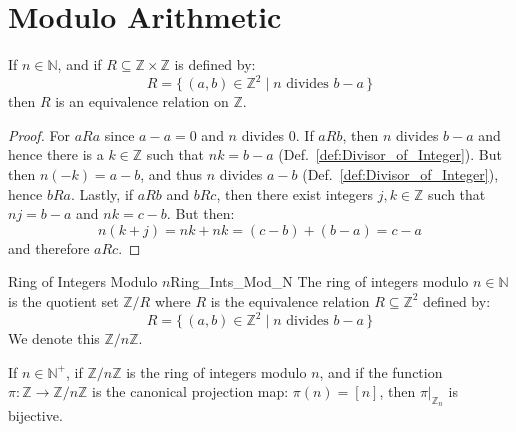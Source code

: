 \section{Modulo Arithmetic}
    \begin{theorem}
        \label{thm:Modulo_n_is_Equiv_Relation}%
        If $n\in\mathbb{N}$, and if
        $R\subseteq\mathbb{Z}\times\mathbb{Z}$ is defined by:
        \begin{equation}
            R=\{\,(a,b)\in\mathbb{Z}^{2}\;|\;
                n\textrm{ divides }b-a\,\}
        \end{equation}
        then $R$ is an equivalence relation on $\mathbb{Z}$.
    \end{theorem}
    \begin{proof}
        For $aRa$ since $a-a=0$ and $n$ divides 0. If $aRb$, then $n$
        divides $b-a$ and hence there is a $k\in\mathbb{Z}$ such that
        $nk=b-a$ (Def.~\ref{def:Divisor_of_Integer}). But then
        $n(\minus{k})=a-b$, and thus $n$ divides $a-b$
        (Def.~\ref{def:Divisor_of_Integer}), hence $bRa$. Lastly, if
        $aRb$ and $bRc$, then there exist integers $j,k\in\mathbb{Z}$
        such that $nj=b-a$ and $nk=c-b$. But then:
        \begin{equation}
            n(k+j)=nk+nk=(c-b)+(b-a)=c-a
        \end{equation}
        and therefore $aRc$.
    \end{proof}
    \begin{fdefinition}{Ring of Integers Modulo $n$}{Ring_Ints_Mod_N}
        The ring of integers modulo $n\in\mathbb{N}$ is the quotient set
        $\mathbb{Z}/R$ where $R$ is the equivalence relation
        $R\subseteq\mathbb{Z}^{2}$ defined by:
        \begin{equation*}
            R=\{\,(a,b)\in\mathbb{Z}^{2}\;|\;n\textrm{ divides }b-a\,\}
        \end{equation*}
        We denote this $\mathbb{Z}/n\mathbb{Z}$.
    \end{fdefinition}
    \begin{theorem}
        \label{thm:Z_n_is_Bij_onto_Z_mod_n}%
        If $n\in\mathbb{N}^{+}$, if $\mathbb{Z}/n\mathbb{Z}$ is the ring
        of integers modulo $n$, and if the function
        $\pi:\mathbb{Z}\rightarrow\mathbb{Z}/n\mathbb{Z}$ is the
        canonical projection map: $\pi(n)=[n]$, then
        $\pi|_{\mathbb{Z}_{n}}$ is bijective.
    \end{theorem}
